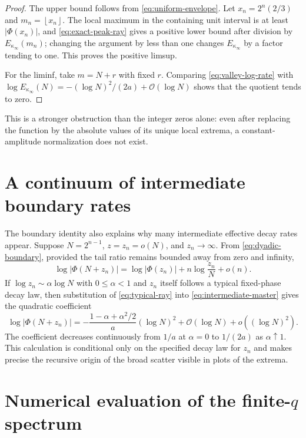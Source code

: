 \documentclass[11pt,oneside]{article}
\theoremstyle{definition}
\theoremstyle{remark}
\newcommand{\Phiup}{\Phi}
\newcommand{\bigO}{\mathcal O}
\newcommand{\floor}[1]{\left\lfloor #1\right\rfloor}
\newcommand{\abs}[1]{\left|#1\right|}
\begin{document}
\begin{proof}
The upper bound follows from \eqref{eq:uniform-envelope}.  Let
$x_n=2^n(2/3)$ and $m_n=\floor{x_n}$.  The local maximum in the containing unit interval is
at least $\abs{\Phiup(x_n)}$, and \eqref{eq:exact-peak-ray} gives a positive lower bound
after division by $E_{\kappa_\infty}(m_n)$; changing the argument by less than one changes
$E_{\kappa_\infty}$ by a factor tending to one.  This proves the positive limsup.

For the liminf, take $m=N+r$ with fixed $r$.  Comparing
\eqref{eq:valley-log-rate} with
$\log E_{\kappa_\infty}(N)=-(\log N)^2/(2a)+\bigO(\log N)$ shows that the quotient tends to
zero.
\end{proof}

This is a stronger obstruction than the integer zeros alone: even after replacing the
function by the absolute values of its unique local extrema, a constant-amplitude
normalization does not exist.

\section{A continuum of intermediate boundary rates}
\label{sec:intermediate-rates}

The boundary identity also explains why many intermediate effective decay rates appear.
Suppose $N=2^{n-1}$, $z=z_n=o(N)$, and $z_n\to\infty$.  From
\eqref{eq:dyadic-boundary}, provided the tail ratio remains bounded away from zero and
infinity,
\begin{equation}
 \log\abs{\Phiup(N+z_n)}
 =\log\abs{\Phiup(z_n)}+n\log\frac{z_n}{N}+o(n).
 \label{eq:intermediate-master}
\end{equation}
If $\log z_n\sim\alpha\log N$ with $0\le\alpha<1$ and $z_n$ itself follows a typical
fixed-phase decay law, then substitution of \eqref{eq:typical-ray} into
\eqref{eq:intermediate-master} gives the quadratic coefficient
\begin{equation}
 \log\abs{\Phiup(N+z_n)}
 =-\frac{1-\alpha+\alpha^2/2}{a}(\log N)^2
  +\bigO(\log N)+o((\log N)^2).
 \label{eq:intermediate-quadratic}
\end{equation}
The coefficient decreases continuously from $1/a$ at $\alpha=0$ to $1/(2a)$ as
$\alpha\uparrow1$.  This calculation is conditional only on the specified decay law for
$z_n$ and makes precise the recursive origin of the broad scatter visible in plots of the
extrema.

\section{Numerical evaluation of the finite-$q$ spectrum}
\label{sec:numerics}
\end{document}
